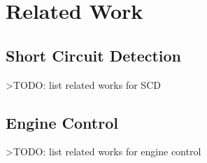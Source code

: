 \section{Related Work}   \label{chap:relatedWork}

\subsection{Short Circuit Detection}

>TODO: list related works for SCD

\subsection{Engine Control}

>TODO: list related works for engine control
